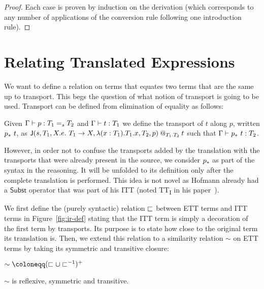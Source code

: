 \begin{proof}
  Each case is proven by induction on the derivation
  (which corresponds to any number of applications of the conversion rule
  following one introduction rule).
\end{proof}

\section{Relating Translated Expressions}
\label{sec:relation}

We want to define a relation on terms that equates two terms that are
the same up to transport.
%
This begs the question of what notion of transport is going to be
used.
%
Transport can be defined from elimination of equality as follows:
%
\begin{definition}[Transport]
  Given $\isterm{\Ga}{p}{\Eq{s}{T_1}{T_2}}$ and
  $\isterm{\Ga}{t}{T_1}$ we define the transport of $t$ along $p$, written
  $\translpo{p}\ t$, as
  $\app
    {\J
      {s}
      {T_1}
      {X.e.\ T_1 \to X}
      {\lam{x:T_1}{T_1} x}
      {T_2}
      {p}
    }
    {T_1}
    {T_2}
    {t}
  $ such that $\isterm{\Ga}{\translpo{p}\ t}{T_2}$.
\end{definition}
%
However, in order not to confuse the transports added by the
translation with the transports that were already present in the
source, we consider $\translpo{p}$ as part of the syntax in the
reasoning. It will be unfolded to its definition only after the
complete translation is performed.
%
This idea is not novel as Hofmann already had a $\mathsf{Subst}$ operator that
was part of his ITT (noted TT\textsubscript{I} in his
paper~).

%
We first define the (purely syntactic) relation $\ir$ between ETT terms
and ITT terms in Figure~\ref{fig:ir-def} stating that the ITT term is
simply a decoration of the first term by transports. Its purpose is to
state how close to the original term its translation is. Then, we extend
this relation to a similarity relation $\sim$ on ETT terms by taking its
symmetric and transitive closure:
\begin{center}$\sim \coloneqq (\ir \cup \ir^{-1})^+$
\end{center}

\begin{lemma}
  \label{lem:sim-er}
  $\sim$ is reflexive, symmetric and transitive.
\end{lemma}

